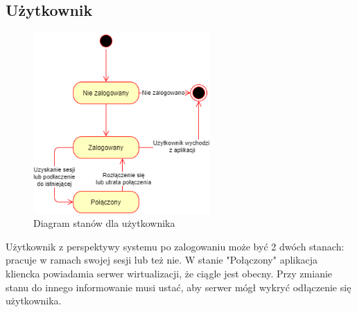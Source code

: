 \documentclass[../opis-rozwiazania.tex]{subfiles}
\begin{document}
\subsection{Użytkownik}

\begin{figure}[H]
    \centering
    \includegraphics[width=0.6\textwidth]{../diagrams/state_diagrams/client.png}
    \caption{Diagram stanów dla użytkownika}
    \label{state_user}
\end{figure}

Użytkownik z perspektywy systemu po zalogowaniu może być 2 dwóch stanach: pracuje w ramach swojej sesji lub też nie.
W stanie "Połączony" aplikacja kliencka powiadamia serwer wirtualizacji, że ciągle jest obecny.
Przy zmianie stanu do innego informowanie musi ustać, aby serwer mógł wykryć odłączenie się użytkownika.
\end{document}

